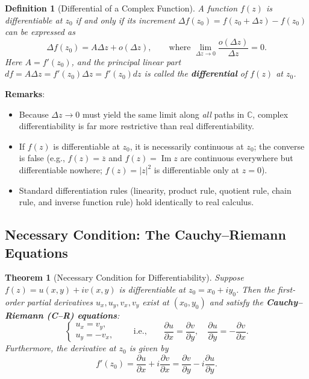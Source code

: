 \documentclass[11pt,a4paper]{article}
\renewcommand{\Im}{\operatorname{Im}}
\theoremstyle{breakdef}
\newtheorem{definition}{Definition}
\theoremstyle{breakthm}
\newtheorem{theorem}{Theorem}
\begin{document}
\begin{definition}[Differential of a Complex Function]
A function $f(z)$ is differentiable at $z_0$ if and only if its increment $\Delta f(z_0) = f(z_0 + \Delta z) - f(z_0)$ can be expressed as
\[
    \Delta f(z_0) = A \Delta z + o(\Delta z), \qquad \text{where } \lim_{\Delta z \to 0} \frac{o(\Delta z)}{\Delta z} = 0.
\]
Here $A = f'(z_0)$, and the principal linear part $df = A \Delta z = f'(z_0)\Delta z = f'(z_0)dz$ is called the \textbf{differential} of $f(z)$ at $z_0$.
\end{definition}

\textbf{Remarks}:
\begin{itemize}
    \item Because $\Delta z \to 0$ must yield the same limit along \emph{all} paths in $\mathbb{C}$, complex differentiability is far more restrictive than real differentiability.
    \item If $f(z)$ is differentiable at $z_0$, it is necessarily continuous at $z_0$; the converse is false (e.g., $f(z) = \overline{z}$ and $f(z) = \Im z$ are continuous everywhere but differentiable nowhere; $f(z) = |z|^2$ is differentiable only at $z = 0$).
    \item Standard differentiation rules (linearity, product rule, quotient rule, chain rule, and inverse function rule) hold identically to real calculus.
\end{itemize}

\subsection{Necessary Condition: The Cauchy--Riemann Equations}

\begin{theorem}[Necessary Condition for Differentiability]
Suppose $f(z) = u(x, y) + iv(x, y)$ is differentiable at $z_0 = x_0 + iy_0$. Then the first-order partial derivatives $u_x, u_y, v_x, v_y$ exist at $(x_0, y_0)$ and satisfy the \textbf{Cauchy--Riemann (C--R) equations}:
\[
    \begin{cases}
        u_x = v_y, \\
        u_y = -v_x,
    \end{cases}
    \qquad \text{i.e.,} \qquad
    \frac{\partial u}{\partial x} = \frac{\partial v}{\partial y}, \quad \frac{\partial u}{\partial y} = -\frac{\partial v}{\partial x}.
\]
Furthermore, the derivative at $z_0$ is given by
\[
    f'(z_0) = \frac{\partial u}{\partial x} + i\frac{\partial v}{\partial x} = \frac{\partial v}{\partial y} - i\frac{\partial u}{\partial y}.
\]
\end{theorem}
\end{document}
